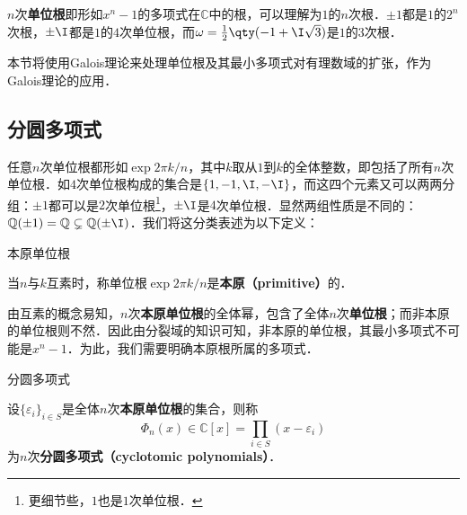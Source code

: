 



$n$次\textbf{单位根}即形如$x^n-1$的多项式在$\mathbb{C}$中的根，可以理解为$1$的$n$次根．$\pm 1$都是$1$的$2^n$次根，$\pm \I$都是$1$的$4$次单位根，而$\omega=\frac{1}{2}\qty(-1+\I\sqrt{3})$是$1$的$3$次根．

本节将使用Galois理论来处理单位根及其最小多项式对有理数域的扩张，作为Galois理论的应用．


\subsection{分圆多项式}

任意$n$次单位根都形如$\exp{2\pi k/n}$，其中$k$取从$1$到$k$的全体整数，即包括了所有$n$次单位根．如$4$次单位根构成的集合是$\{1, -1, \I, -\I\}$，而这四个元素又可以两两分组：$\pm 1$都可以是$2$次单位根\footnote{更细节些，$1$也是$1$次单位根．}，$\pm \I$是$4$次单位根．显然两组性质是不同的：$\mathbb{Q}(\pm 1)=\mathbb{Q}\subsetneq \mathbb{Q}(\pm\I)$．我们将这分类表述为以下定义：

\begin{definition}{本原单位根}

当$n$与$k$互素时，称单位根$\exp{2\pi k/n}$是\textbf{本原（primitive）}的．

\end{definition}

由互素的概念易知，$n$次\textbf{本原单位根}的全体幂，包含了全体$n$次\textbf{单位根}；而非本原的单位根则不然．因此由分裂域的知识可知，非本原的单位根，其最小多项式不可能是$x^n-1$．为此，我们需要明确本原根所属的多项式．

\begin{definition}{分圆多项式}

设$\{\varepsilon_i\}_{i\in S}$是全体$n$次\textbf{本原单位根}的集合，则称
\begin{equation}
\Phi_n(x)\in \mathbb{C}[x] = \prod_{i\in S}(x-\varepsilon_i)
\end{equation}
为$n$次\textbf{分圆多项式（cyclotomic polynomials）}．

\end{definition}




